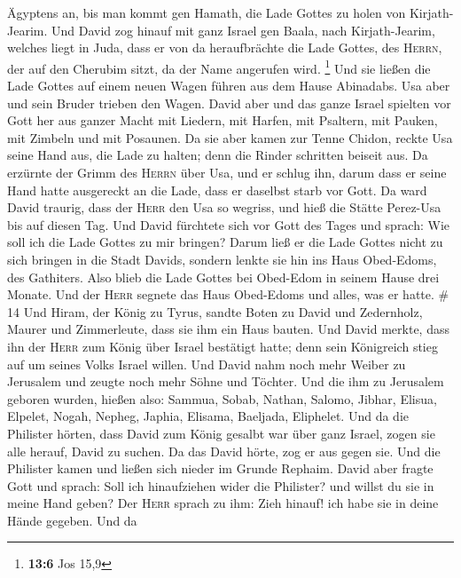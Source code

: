 Ägyptens an, bis man kommt gen Hamath, die Lade Gottes zu holen von
Kirjath-Jearim.  Und David zog hinauf mit ganz Israel gen
Baala, nach Kirjath-Jearim, welches liegt in Juda, dass er von da
heraufbrächte die Lade Gottes, des \textsc{Herrn}, der auf den Cherubim
sitzt, da der Name angerufen wird. \footnote{\textbf{13:6} Jos 15,9}
 Und sie ließen die Lade Gottes auf einem neuen Wagen
führen aus dem Hause Abinadabs. Usa aber und sein Bruder trieben den
Wagen.  David aber und das ganze Israel spielten vor Gott
her aus ganzer Macht mit Liedern, mit Harfen, mit Psaltern, mit Pauken,
mit Zimbeln und mit Posaunen.  Da sie aber kamen zur Tenne
Chidon, reckte Usa seine Hand aus, die Lade zu halten; denn die Rinder
schritten beiseit aus.  Da erzürnte der Grimm des
\textsc{Herrn} über Usa, und er schlug ihn, darum dass er seine Hand
hatte ausgereckt an die Lade, dass er daselbst starb vor Gott.
 Da ward David traurig, dass der \textsc{Herr} den Usa so
wegriss, und hieß die Stätte Perez-Usa bis auf diesen Tag.
 Und David fürchtete sich vor Gott des Tages und sprach:
Wie soll ich die Lade Gottes zu mir bringen?  Darum ließ
er die Lade Gottes nicht zu sich bringen in die Stadt Davids, sondern
lenkte sie hin ins Haus Obed-Edoms, des Gathiters.  Also
blieb die Lade Gottes bei Obed-Edom in seinem Hause drei Monate. Und der
\textsc{Herr} segnete das Haus Obed-Edoms und alles, was er hatte. \# 14
 Und Hiram, der König zu Tyrus, sandte Boten zu David und
Zedernholz, Maurer und Zimmerleute, dass sie ihm ein Haus bauten.
 Und David merkte, dass ihn der \textsc{Herr} zum König
über Israel bestätigt hatte; denn sein Königreich stieg auf um seines
Volks Israel willen.  Und David nahm noch mehr Weiber zu
Jerusalem und zeugte noch mehr Söhne und Töchter.  Und die
ihm zu Jerusalem geboren wurden, hießen also: Sammua, Sobab, Nathan,
Salomo,  Jibhar, Elisua, Elpelet,  Nogah,
Nepheg, Japhia,  Elisama, Baeljada, Eliphelet.
 Und da die Philister hörten, dass David zum König gesalbt
war über ganz Israel, zogen sie alle herauf, David zu suchen. Da das
David hörte, zog er aus gegen sie.  Und die Philister
kamen und ließen sich nieder im Grunde Rephaim.  David
aber fragte Gott und sprach: Soll ich hinaufziehen wider die Philister?
und willst du sie in meine Hand geben? Der \textsc{Herr} sprach zu ihm:
Zieh hinauf! ich habe sie in deine Hände gegeben.  Und da
